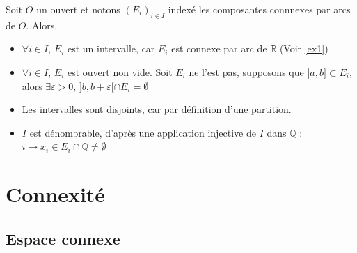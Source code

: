 \begin{myproof}{}{}
Soit $O$ un ouvert et notons $(E_i) _{i\in I}$ indexé les composantes connnexes par arcs de $O$. Alors, 
\begin{itemize}

  \item $\forall i\in I$, $E_i$ est un intervalle, car $E_i$ est connexe par arc de $\mathbb{R}$ (Voir \ref{ex1})

  \item $\forall i\in I$, $E_i$ est ouvert non vide. Soit $E_i$ ne l'est pas, supposons que $]a,b] \subset E_i$, alors $\exists \varepsilon >0$, $]b,b+\varepsilon[ \cap E_i = \emptyset$

  \item Les intervalles sont disjoints, car par définition d'une partition.

  \item $I$ est dénombrable, d'après une application injective de $I$ dans $\mathbb{Q}$ : $i \mapsto x_i \in E_i \cap \mathbb{Q} \ne \emptyset$

\end{itemize}
\end{myproof}



\newpage
\section{Connexité}

\subsection{Espace connexe} %
\label{sub:Espace connexe}

